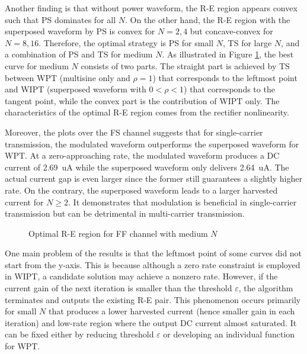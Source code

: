 Another finding is that without power waveform, the R-E region appears convex such that PS dominates for all $N$. On the other hand, the R-E region with the superposed waveform by PS is convex for $N = 2,4$ but concave-convex for $N = 8,16$. Therefore, the optimal strategy is PS for small $N$, TS for large $N$, and a combination of PS and TS for medium $N$. As illustrated in Figure \ref{fig:siso-subband-optimal}, the best curve for medium $N$ consists of two parts. The straight part is achieved by TS between WPT (multisine only and $\rho  = 1$) that corresponds to the leftmost point and WIPT (superposed waveform with $0 < \rho  < 1$) that corresponds to the tangent point, while the convex part is the contribution of WIPT only. The characteristics of the optimal R-E region comes from the rectifier nonlinearity.

Moreover, the plots over the FS channel suggests that for single-carrier transmission, the modulated waveform outperforms the superposed waveform for WPT. At a zero-approaching rate, the modulated waveform produces a DC current of \SI{2.69}{uA} while the superposed waveform only delivers \SI{2.64}{uA}. The actual current gap is even larger since the former still guarantees a slightly higher rate. On the contrary, the superposed waveform leads to a larger harvested current for $N \geqslant 2$. It demonstrates that modulation is beneficial in single-carrier transmission but can be detrimental in multi-carrier transmission.

\begin{figure}[ht]
  \centering
  \caption{Optimal R-E region for FF channel with medium $N$}\label{fig:siso-subband-optimal}
\end{figure}

One main problem of the results is that the leftmost point of some curves did not start from the y-axis. This is because although a zero rate constraint is employed in WIPT, a candidate solution may achieve a nonzero rate. However, if the current gain of the next iteration is smaller than the threshold $\varepsilon$, the algorithm terminates and outputs the existing R-E pair. This phenomenon occurs primarily for small $N$ that produces a lower harvested current (hence smaller gain in each iteration) and low-rate region where the output DC current almost saturated. It can be fixed either by reducing threshold $\varepsilon$ or developing an individual function for WPT.

